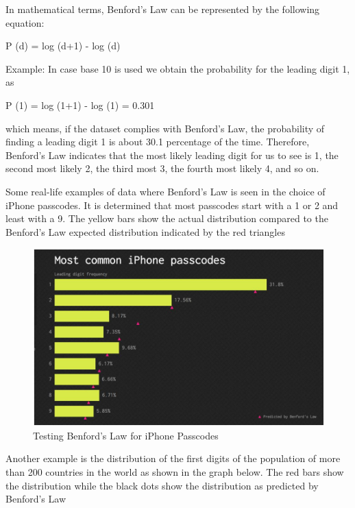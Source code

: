 In mathematical terms, Benford’s Law can be represented 
by the following equation:

P (d) = log (d+1) - log (d)

Example: In case base 10 is used we obtain the 
probability for the leading digit 1, as

P (1) = log (1+1) - log (1) = 0.301

which means, if the dataset complies 
with Benford's Law, the probability of finding a 
leading digit 1 is about 30.1 percentage of the time. 
Therefore, Benford’s Law indicates that the most 
likely leading digit for us to see is 1, the second 
most likely 2, the third most 3, the fourth most 
likely 4, and so on.

Some real-life examples of data where Benford’s Law is 
seen in the choice of iPhone passcodes. 
It is determined that most passcodes start with a 1 or  
2 and least with a 9. The yellow bars show the actual
distribution compared to the Benford’s 
Law expected distribution indicated by the 
red triangles~\cite{hid-sp18-514-iphone-benford}

\begin{figure}[!ht]
\centering\includegraphics[width=\columnwidth]{images/iphone_benford.JPG}
  \caption{Testing Benford's Law for iPhone Passcodes}\label{f:iphone-pass_ben}
\end{figure}


Another example is the distribution of the first 
digits of the population of more than 200 countries 
in the world as shown in the graph below. 
The red bars show the distribution while 
the black dots show the distribution as 
predicted by Benford’s Law~\cite{hid-sp18-514-benfordwiki}

